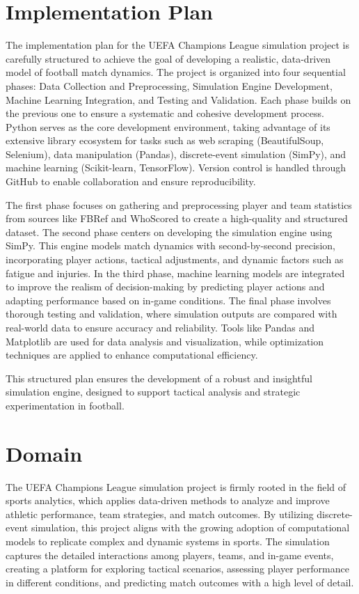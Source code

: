 \documentclass[12pt]{article}
\begin{document}
\section{Implementation Plan}
The implementation plan for the UEFA Champions League simulation project is carefully structured to achieve the goal of developing a realistic, data-driven model of football match dynamics. The project is organized into four sequential phases: Data Collection and Preprocessing, Simulation Engine Development, Machine Learning Integration, and Testing and Validation. Each phase builds on the previous one to ensure a systematic and cohesive development process. Python serves as the core development environment, taking advantage of its extensive library ecosystem for tasks such as web scraping (BeautifulSoup, Selenium), data manipulation (Pandas), discrete-event simulation (SimPy), and machine learning (Scikit-learn, TensorFlow). Version control is handled through GitHub to enable collaboration and ensure reproducibility.

The first phase focuses on gathering and preprocessing player and team statistics from sources like FBRef and WhoScored to create a high-quality and structured dataset. The second phase centers on developing the simulation engine using SimPy. This engine models match dynamics with second-by-second precision, incorporating player actions, tactical adjustments, and dynamic factors such as fatigue and injuries. In the third phase, machine learning models are integrated to improve the realism of decision-making by predicting player actions and adapting performance based on in-game conditions. The final phase involves thorough testing and validation, where simulation outputs are compared with real-world data to ensure accuracy and reliability. Tools like Pandas and Matplotlib are used for data analysis and visualization, while optimization techniques are applied to enhance computational efficiency.

This structured plan ensures the development of a robust and insightful simulation engine, designed to support tactical analysis and strategic experimentation in football.

\section{Domain}
The UEFA Champions League simulation project is firmly rooted in the field of sports analytics, which applies data-driven methods to analyze and improve athletic performance, team strategies, and match outcomes. By utilizing discrete-event simulation, this project aligns with the growing adoption of computational models to replicate complex and dynamic systems in sports. The simulation captures the detailed interactions among players, teams, and in-game events, creating a platform for exploring tactical scenarios, assessing player performance in different conditions, and predicting match outcomes with a high level of detail.
\end{document}
